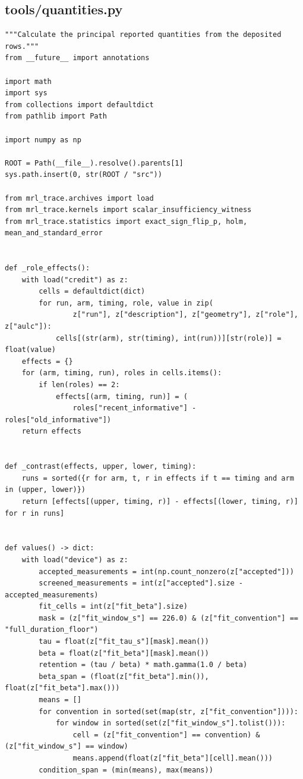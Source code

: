 \documentclass[a4paper,10pt]{article}
\begin{document}
\subsection{tools/quantities.py}
\begin{Verbatim}
"""Calculate the principal reported quantities from the deposited rows."""
from __future__ import annotations

import math
import sys
from collections import defaultdict
from pathlib import Path

import numpy as np

ROOT = Path(__file__).resolve().parents[1]
sys.path.insert(0, str(ROOT / "src"))

from mrl_trace.archives import load
from mrl_trace.kernels import scalar_insufficiency_witness
from mrl_trace.statistics import exact_sign_flip_p, holm, mean_and_standard_error


def _role_effects():
    with load("credit") as z:
        cells = defaultdict(dict)
        for run, arm, timing, role, value in zip(
                z["run"], z["description"], z["geometry"], z["role"], z["aulc"]):
            cells[(str(arm), str(timing), int(run))][str(role)] = float(value)
    effects = {}
    for (arm, timing, run), roles in cells.items():
        if len(roles) == 2:
            effects[(arm, timing, run)] = (
                roles["recent_informative"] - roles["old_informative"])
    return effects


def _contrast(effects, upper, lower, timing):
    runs = sorted({r for arm, t, r in effects if t == timing and arm in (upper, lower)})
    return [effects[(upper, timing, r)] - effects[(lower, timing, r)] for r in runs]


def values() -> dict:
    with load("device") as z:
        accepted_measurements = int(np.count_nonzero(z["accepted"]))
        screened_measurements = int(z["accepted"].size - accepted_measurements)
        fit_cells = int(z["fit_beta"].size)
        mask = (z["fit_window_s"] == 226.0) & (z["fit_convention"] == "full_duration_floor")
        tau = float(z["fit_tau_s"][mask].mean())
        beta = float(z["fit_beta"][mask].mean())
        retention = (tau / beta) * math.gamma(1.0 / beta)
        beta_span = (float(z["fit_beta"].min()), float(z["fit_beta"].max()))
        means = []
        for convention in sorted(set(map(str, z["fit_convention"]))):
            for window in sorted(set(z["fit_window_s"].tolist())):
                cell = (z["fit_convention"] == convention) & (z["fit_window_s"] == window)
                means.append(float(z["fit_beta"][cell].mean()))
        condition_span = (min(means), max(means))


\end{Verbatim}
\end{document}
